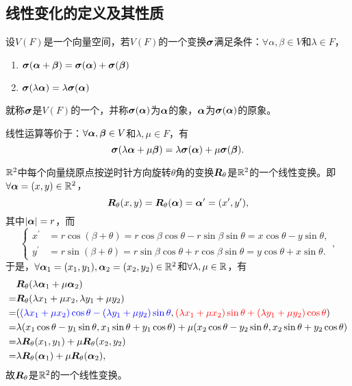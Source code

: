 \subsection{线性变化的定义及其性质}
\begin{frame}
\begin{dingyi}[线性变换]
  设$V(F)$是一个向量空间，若$V(F)$的一个变换$\boldsymbol{\sigma}$满足条件：$\forall \alpha,\beta\in V$和$\lambda\in F$，
  \begin{enumerate}
    \item $\boldsymbol{\sigma}(\boldsymbol{\alpha}+\boldsymbol{\beta}) = \boldsymbol{\sigma}(\boldsymbol{\alpha}) + \boldsymbol{\sigma}(\boldsymbol{\beta})$\\[0.1in]
    \item $\boldsymbol{\sigma}(\lambda\boldsymbol{\alpha}) = \lambda\boldsymbol{\sigma}(\boldsymbol{\alpha})$
  \end{enumerate}
  就称$\boldsymbol{\sigma}$是$V(F)$的一个，并称$\boldsymbol{\sigma}(\boldsymbol{\alpha})$为$\boldsymbol{\alpha}$的象，$\boldsymbol{\alpha}$为$\boldsymbol{\sigma}(\boldsymbol{\alpha})$的原象。
\end{dingyi}
\vspace{.1in}\pause 

线性运算等价于：$\forall \boldsymbol{\alpha},\boldsymbol{\beta}\in V$和$\lambda, \mu \in F$，有
$$
\boldsymbol{\sigma}(\lambda\boldsymbol{\alpha}+\mu\boldsymbol{\beta}) = \lambda\boldsymbol{\sigma}(\boldsymbol{\alpha})+\mu\boldsymbol{\sigma}(\boldsymbol{\beta}).
$$
\end{frame}

\begin{frame}
  \begin{li}[旋转变换]
    $\mathbb R^2$中每个向量绕原点按逆时针方向旋转$\theta$角的变换$\boldsymbol{R}_\theta$是$\mathbb R^2$的一个线性变换。即$\forall\boldsymbol{\alpha}=(x,y)\in\mathbb R^2$，
    $$
    \boldsymbol{R}_\theta(x,y)=\boldsymbol{R}_\theta(\boldsymbol{\alpha})=\boldsymbol{\alpha}^\prime=(x^\prime,y^\prime),
    $$
    其中$|\boldsymbol{\alpha}|=r$，而
    $$
    \left\{
      \begin{array}{ll}
        x^\prime&=r\cos(\beta+\theta)=r\cos\beta\cos\theta-r\sin\beta\sin\theta=x\cos\theta-y\sin\theta,\\
        y^\prime&=r\sin(\beta+\theta)=r\sin\beta\cos\theta+r\cos\beta\sin\theta=y\cos\theta+x\sin\theta.
      \end{array}
    \right.,
    $$
    于是，$\forall \boldsymbol{\alpha}_1=(x_1,y_1), \boldsymbol{\alpha}_2=(x_2,y_2)\in \mathbb R^2$和$\forall \lambda,\mu\in \mathbb R$，有
    $$
    \begin{aligned}
      &\boldsymbol{R}_\theta(\lambda\boldsymbol{\alpha}_1+\mu\boldsymbol{\alpha}_2)\\
      =&\boldsymbol{R}_\theta(\lambda x_1+\mu x_2, \lambda y_1+\mu y_2) \\
      =&(\textcolor{blue}{(\lambda x_1+\mu x_2)\cos\theta-(\lambda y_1+\mu y_2)\sin\theta}, \textcolor{red}{(\lambda x_1+\mu x_2)\sin\theta+(\lambda y_1+\mu y_2)\cos\theta})\\
      =&\lambda(x_1\cos\theta-y_1\sin\theta,x_1\sin\theta+y_1\cos\theta)+\mu(x_2\cos\theta-y_2\sin\theta,x_2\sin\theta+y_2\cos\theta)\\
      =&\lambda\boldsymbol{R}_\theta(x_1,y_1)+\mu\boldsymbol{R}_\theta(x_2,y_2)\\
      =&\lambda\boldsymbol{R}_\theta(\boldsymbol{\alpha}_1)+\mu\boldsymbol{R}_\theta(\boldsymbol{\alpha}_2),
    \end{aligned}
    $$
    故$\boldsymbol{R}_\theta$是$\mathbb R^2$的一个线性变换。

  \end{li}
\end{frame}

